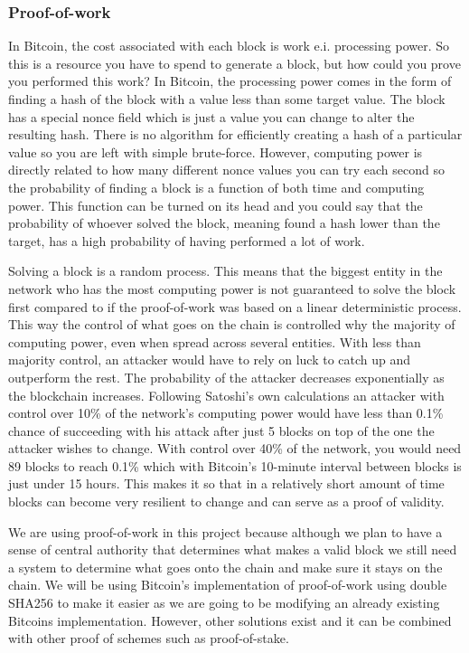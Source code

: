 \documentclass[11pt]{article}
\begin{document}
\subsubsection{Proof-of-work}\label{subsubsec:proofofwork}
In Bitcoin, the cost associated with each block is work e.i. processing power. So this is a resource you have to spend to generate a block, but how could you prove you performed this work? In Bitcoin, the processing power comes in the form of finding a hash of the block with a value less than some target value. The block has a special nonce field which is just a value you can change to alter the resulting hash. There is no algorithm for efficiently creating a hash of a particular value so you are left with simple brute-force. However, computing power is directly related to how many different nonce values you can try each second so the probability of finding a block is a function of both time and computing power. This function can be turned on its head and you could say that the probability of whoever solved the block, meaning found a hash lower than the target, has a high probability of having performed a lot of work.


Solving a block is a random process. This means that the biggest entity in the network who has the most computing power is not guaranteed to solve the block first compared to if the proof-of-work was based on a linear deterministic process. This way the control of what goes on the chain is controlled why the majority of computing power, even when spread across several entities. With less than majority control, an attacker would have to rely on luck to catch up and outperform the rest. The probability of the attacker decreases exponentially as the blockchain increases. Following Satoshi's own calculations\cite{nakamoto2009bitcoin} an attacker with control over 10\% of the network's computing power would have less than 0.1\% chance of succeeding with his attack after just 5 blocks on top of the one the attacker wishes to change. With control over 40\% of the network, you would need 89 blocks to reach 0.1\% which with Bitcoin's 10-minute interval between blocks is just under 15 hours. This makes it so that in a relatively short amount of time blocks can become very resilient to change and can serve as a proof of validity.

We are using proof-of-work in this project because although we plan to have a sense of central authority that determines what makes a valid block we still need a system to determine what goes onto the chain and make sure it stays on the chain. We will be using Bitcoin's implementation of proof-of-work using double SHA256 to make it easier as we are going to be modifying an already existing Bitcoins implementation. However, other solutions exist and it can be combined with other proof of schemes such as proof-of-stake.
\end{document}
